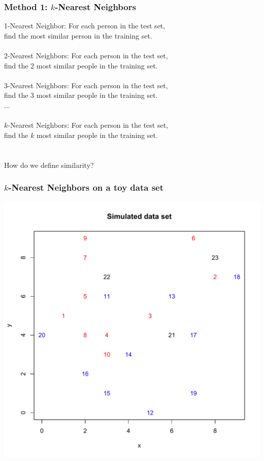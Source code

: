 \documentclass{beamer}
\begin{document}
\begin{frame}
\frametitle{Method 1: $k$-Nearest Neighbors}
1-Nearest Neighbor: For each person in the test set,\\
\hspace{2.5cm} find the most similar person in the training set.\\~\\
2-Nearest Neighbors: For each person in the test set,\\
\hspace{2.5cm} find the 2 most similar people in the training set.\\~\\
3-Nearest Neighbors: For each person in the test set,\\
\hspace{2.5cm} find the 3 most similar people in the training set.\\
...\\~\\
$k$-Nearest Neighbors: For each person in the test set,\\
\hspace{2.5cm} find the $k$ most similar people in the training set.\\~\\~\\
How do we define similarity?
\end{frame}

\begin{frame}
\frametitle{$k$-Nearest Neighbors on a toy data set}
\begin{center}
\includegraphics[scale=0.4]{plot.pdf}
\end{center}
\end{frame}
\end{document}
